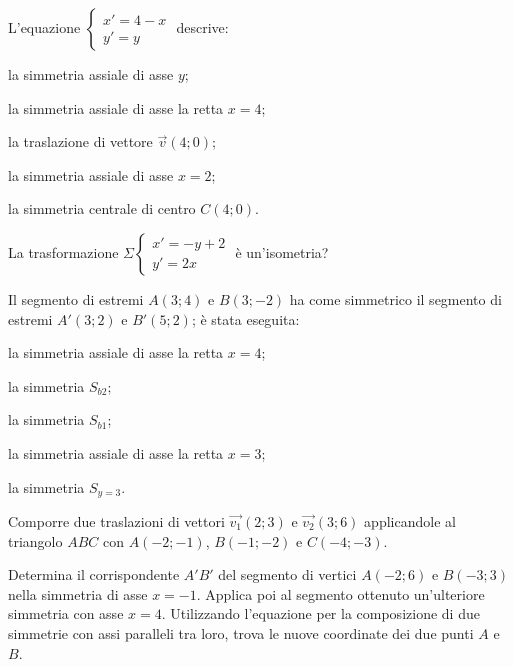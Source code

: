 \begin{esercizio}
  \label{ese:8.87} %
  L'equazione $\begin{cases}x'=4-x\\y'=y\end{cases}$ descrive: 
  \begin{enumeratea}
    \item la simmetria assiale di asse $y$;
    \item la simmetria assiale di asse la retta $x=4$;
    \item la traslazione di vettore $\vec{v}(4;0)$;
    \item la simmetria assiale di asse $x=2$;
    \item la simmetria centrale di centro $C(4;0)$.
  \end{enumeratea}
\end{esercizio}

\begin{esercizio}
  \label{ese:8.88} %
  La trasformazione $\Sigma \begin{cases}x'=-y+2\\y'=2x\end{cases}$ è 
  un'isometria?
\end{esercizio}

\begin{esercizio}
  \label{ese:8.89} %
  Il segmento di estremi $A(3;4)$ e $B(3;-2)$ ha come simmetrico il 
  segmento di estremi $A'(3;2)$ e $B'(5;2)$; è stata eseguita:
  \begin{enumeratea}
    \item la simmetria assiale di asse la retta $x=4$;
    \item la simmetria $S_{b2}$;
    \item la simmetria $S_{b1}$;
    \item la simmetria assiale di asse la retta $x=3$;
    \item la simmetria $S_{y=3}$.
  \end{enumeratea}
\end{esercizio}

\begin{esercizio}
  \label{ese:8.97} %
  Comporre due traslazioni di vettori $\vec{v_1}(2;3)$ e 
  $\vec{v_2}(3;6)$ applicandole al triangolo $ABC$ con $A(-2;-1)$, 
  $B(-1;-2)$ e $C(-4;-3)$.
\end{esercizio}

\begin{esercizio}
  \label{ese:8.98} %
  Determina il corrispondente $A'B'$ del segmento di vertici $A(-2;6)$ 
  e $B(-3;3)$ nella simmetria di asse $x=-1$. Applica poi al segmento 
  ottenuto un'ulteriore simmetria con asse $x=4$. Utilizzando 
  l'equazione per la composizione di due simmetrie con assi paralleli 
  tra loro, trova le nuove coordinate dei due punti $A$ e $B$.
\end{esercizio}

